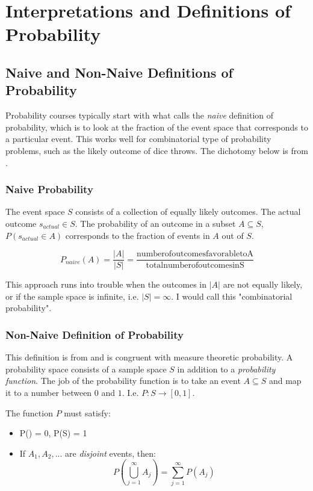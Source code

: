 \section{Interpretations and Definitions of Probability}

\subsection{Naive and Non-Naive Definitions of Probability}
Probability courses typically start with what  calls the \textit{naive} definition of probability, which is to look at the fraction of the event space that corresponds to a particular event. This works well for combinatorial type of probability problems, such as the likely outcome of dice throws. The dichotomy below is from .

\subsubsection{Naive Probability}
The event space $S$ consists of a collection of equally likely outcomes. The actual outcome $s_{actual} \in S$. The probability of an outcome in a subset $A\subseteq S$, $P(s_{actual}\in A)$ corresponds to the fraction of events in $A$ out of $S$.

\begin{equation}
P_{naive}(A) = \frac{|A|}{|S|} = \frac{\mathrm{number of outcomes favorable to A}}{\mathrm{total number of outcomes in S}}
\end{equation}

This approach runs into trouble when the outcomes in $|A|$ are not equally likely, or if the sample space is infinite, i.e. $|S|=\infty$. I would call this "combinatorial probability".


\subsubsection{Non-Naive Definition of Probability}
This definition is from \cite{blitzstein2019introduction} and is congruent with measure theoretic probability. A probability space consists of a sample space $S$ in addition to a \textit{probability function}. The job of the probability function is to take an event $A\subseteq S$ and map it to a number between $0$ and $1$. I.e.  $P: S \rightarrow [0,1]$.

The function $P$ must satisfy:

\begin{itemize}
\item P(\empty) = 0, P(S) = 1
\item If $A_1, A_2,...$ are \textit{disjoint} events, then: \begin{equation}P\left(\bigcup^{\infty}_{j=1}A_j \right) = \sum_{j=1}^{\infty}P(A_j)\end{equation}
\end{itemize}


